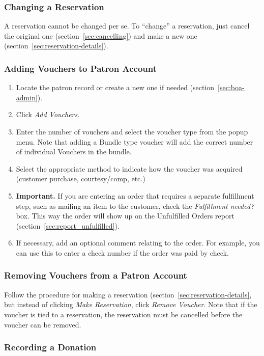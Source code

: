 \subsubsection{Changing a Reservation}

A reservation cannot be changed per se.  To ``change'' a reservation,
just cancel the original one (section~\ref{sec:cancelling}) and make a
new one (section~\ref{sec:reservation-details}).

\subsubsection{Adding Vouchers to Patron Account}

\begin{enumerate}
\item  Locate the patron record or create a new one if needed
  (section~\ref{sec:boa-admin}). 
\item Click \emph{Add Vouchers}.
\item Enter the number of vouchers and select the voucher type from the
  popup menu.  Note that adding a Bundle type voucher will add the
  correct number of individual Vouchers in the bundle.
\item Select the appropriate method to indicate how the voucher was
  acquired (customer purchase, courtesy/comp, etc.)
\item \textbf{Important.}  If you are entering an order that requires a
  separate fulfillment step, such as mailing an item to the customer,
  check the \emph{Fulfillment needed?} box.  This way the order will
  show up on the Unfulfilled Orders report (section~\ref{sec:report_unfulfilled}).
\item If necessary, add an optional comment relating to the order. For
  example, you can use this to enter a check number if the order was
  paid by check.
\end{enumerate}

\subsubsection{Removing Vouchers from a Patron Account}

Follow the procedure for making a reservation
(section~\ref{sec:reservation-details}, but instead of clicking
\emph{Make Reservation}, click \emph{Remove Voucher}. Note that if the
voucher is tied to a reservation, the reservation must be cancelled
before the voucher can be removed.

\subsubsection{Recording a Donation}

